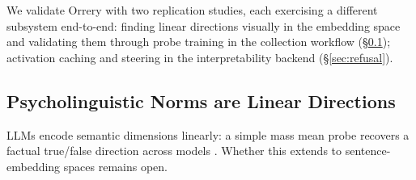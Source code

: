 \documentclass[11pt]{article}
\begin{document}

We validate Orrery with two replication studies, each exercising a different subsystem end-to-end: finding linear directions visually in the embedding space and validating them through probe training in the collection workflow (\S\ref{sec:glasgow}); activation caching and steering in the interpretability backend (\S\ref{sec:refusal}).


\subsection{Psycholinguistic Norms are Linear Directions}
\label{sec:glasgow}






LLMs encode semantic dimensions linearly: a simple mass mean probe recovers a factual true/false direction across models \cite{Marks2023TheGO}. Whether this extends to sentence-embedding spaces remains open.



\end{document}
